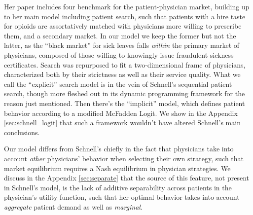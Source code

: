 \documentclass[../main.tex]{subfiles}
\begin{document}
Her paper includes four benchmark for the patient-physician market, building up to her main model including patient search, such that patients with a hire taste for opioids are assortatively matched with physicians more willing to prescribe them, and a secondary market. In our model we keep the former but not the latter, as the ``black market'' for sick leaves falls \textit{within} the primary market of physicians, composed of those willing to knowingly issue fraudulent sickness certificates. Search was repurposed to fit a two-dimensional frame of physicians, characterized both by their strictness as well as their service quality. What we call the ``explicit'' search model is in the vein of Schnell's sequential patient search, though more fleshed out in its dynamic programming framework for the reason just mentioned. Then there's the ``implicit'' model, which defines patient behavior according to a modified McFadden Logit. We show in the Appendix \ref{sec:schnell_logit} that such a framework wouldn't have altered Schnell's main conclusions.

Our model differs from Schnell's chiefly in the fact that physicians take into account \textit{other} physicians' behavior when selecting their own strategy, such that market equilibrium requires a Nash equilibrium in physician strategies. We discuss in the Appendix \ref{sec:separate} that the source of this feature, not present in Schnell's model, is the lack of additive separability across patients in the physician's utility function, such that her optimal behavior takes into account \textit{aggregate} patient demand as well as \textit{marginal}.
\end{document}
